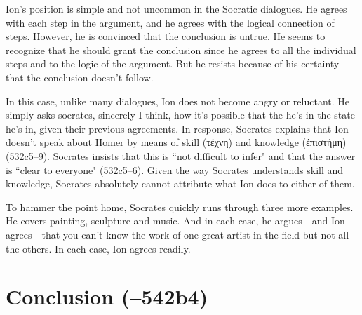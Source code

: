 \documentclass[11pt]{article}
\begin{document}
Ion's position is simple and not uncommon in the Socratic dialogues.  He
agrees with each step in the argument, and he agrees with the logical
connection of steps.  However, he is convinced that the conclusion is
untrue.  He seems to recognize that he should grant the conclusion since he
agrees to all the individual steps and to the logic of the argument.  But
he resists because of his certainty that the conclusion doesn't follow.

In this case, unlike many dialogues, Ion does not become angry or
reluctant.  He simply asks socrates, sincerely I think, how it's possible
that the he's in the state he's in, given their previous agreements.  In
response, Socrates explains that Ion doesn't speak about Homer by means of
skill (τέχνη) and knowledge (ἐπιστήμη) (532c5--9).  Socrates insists that
this is ``not difficult to infer" and that the answer is ``clear to
everyone" (532c5--6).  Given the way Socrates understands skill and
knowledge, Socrates absolutely cannot attribute what Ion does to either of
them.

To hammer the point home, Socrates quickly runs through three more
examples.  He covers painting, sculpture and music.  And in each case, he
argues---and Ion agrees---that you can't know the work of one great artist
in the field but not all the others.  In each case, Ion agrees readily.


\section{Conclusion (--542b4)}


\newpage


\end{document}
